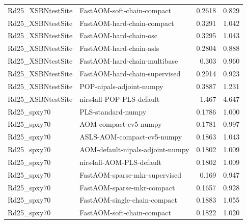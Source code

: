 \begin{landscape}
\begin{longtable}{L{8.0cm}L{9.5cm}rr}
Rd25\_\allowbreak{}XSBNtestSite & FastAOM-\allowbreak{}soft-\allowbreak{}chain-\allowbreak{}compact & 0.2618 & 0.829 \\
Rd25\_\allowbreak{}XSBNtestSite & FastAOM-\allowbreak{}hard-\allowbreak{}chain-\allowbreak{}compact & 0.3291 & 1.042 \\
Rd25\_\allowbreak{}XSBNtestSite & FastAOM-\allowbreak{}hard-\allowbreak{}chain-\allowbreak{}osc & 0.3295 & 1.043 \\
Rd25\_\allowbreak{}XSBNtestSite & FastAOM-\allowbreak{}hard-\allowbreak{}chain-\allowbreak{}asls & 0.2804 & 0.888 \\
Rd25\_\allowbreak{}XSBNtestSite & FastAOM-\allowbreak{}hard-\allowbreak{}chain-\allowbreak{}multibase & 0.303 & 0.960 \\
Rd25\_\allowbreak{}XSBNtestSite & FastAOM-\allowbreak{}hard-\allowbreak{}chain-\allowbreak{}supervised & 0.2914 & 0.923 \\
Rd25\_\allowbreak{}XSBNtestSite & POP-\allowbreak{}nipals-\allowbreak{}adjoint-\allowbreak{}numpy & 0.3887 & 1.231 \\
Rd25\_\allowbreak{}XSBNtestSite & nirs4all-\allowbreak{}POP-\allowbreak{}PLS-\allowbreak{}default & 1.467 & 4.647 \\
Rd25\_\allowbreak{}spxy70 & PLS-\allowbreak{}standard-\allowbreak{}numpy & 0.1786 & 1.000 \\
Rd25\_\allowbreak{}spxy70 & AOM-\allowbreak{}compact-\allowbreak{}cv5-\allowbreak{}numpy & 0.1781 & 0.997 \\
Rd25\_\allowbreak{}spxy70 & ASLS-\allowbreak{}AOM-\allowbreak{}compact-\allowbreak{}cv5-\allowbreak{}numpy & 0.1863 & 1.043 \\
Rd25\_\allowbreak{}spxy70 & AOM-\allowbreak{}default-\allowbreak{}nipals-\allowbreak{}adjoint-\allowbreak{}numpy & 0.1802 & 1.009 \\
Rd25\_\allowbreak{}spxy70 & nirs4all-\allowbreak{}AOM-\allowbreak{}PLS-\allowbreak{}default & 0.1802 & 1.009 \\
Rd25\_\allowbreak{}spxy70 & FastAOM-\allowbreak{}sparse-\allowbreak{}mkr-\allowbreak{}supervised & 0.169 & 0.947 \\
Rd25\_\allowbreak{}spxy70 & FastAOM-\allowbreak{}sparse-\allowbreak{}mkr-\allowbreak{}compact & 0.1657 & 0.928 \\
Rd25\_\allowbreak{}spxy70 & FastAOM-\allowbreak{}single-\allowbreak{}chain-\allowbreak{}compact & 0.1883 & 1.055 \\
Rd25\_\allowbreak{}spxy70 & FastAOM-\allowbreak{}soft-\allowbreak{}chain-\allowbreak{}compact & 0.1822 & 1.020 \\

\end{longtable}
\end{landscape}
